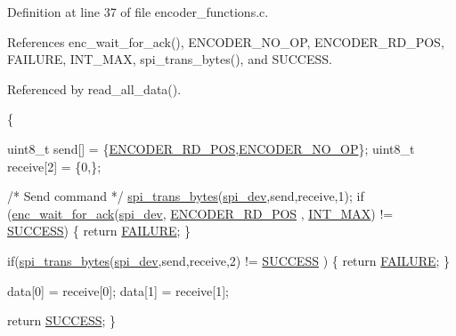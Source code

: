 Definition at line 37 of file encoder\-\_\-functions.\-c.



References enc\-\_\-wait\-\_\-for\-\_\-ack(), E\-N\-C\-O\-D\-E\-R\-\_\-\-N\-O\-\_\-\-O\-P, E\-N\-C\-O\-D\-E\-R\-\_\-\-R\-D\-\_\-\-P\-O\-S, F\-A\-I\-L\-U\-R\-E, I\-N\-T\-\_\-\-M\-A\-X, spi\-\_\-trans\-\_\-bytes(), and S\-U\-C\-C\-E\-S\-S.



Referenced by read\-\_\-all\-\_\-data().


\begin{DoxyCode}
                                                      \{

    uint8\_t send[] = \{\hyperlink{encoder__functions_8h_a24e6c0e05e904b10f56ae184da9e2aca}{ENCODER\_RD\_POS},\hyperlink{encoder__functions_8h_ac10b0f18ed2164776ad6843aa7908592}{ENCODER\_NO\_OP}\};
    uint8\_t receive[2] = \{0,\};
    
    \textcolor{comment}{/* Send command */}
    \hyperlink{communication_2spi__functions_8c_a3ae450d2b3ece27bb6036f811a7625a9}{spi\_trans\_bytes}(\hyperlink{CommunicationV0_2communication_8c_a4788f0a5355494bc6c13690e28f43783}{spi\_dev},send,receive,1);
    \textcolor{keywordflow}{if} (\hyperlink{group__enc_gad82fb44f2e735628ec95e003e4a1f93c}{enc\_wait\_for\_ack}(\hyperlink{CommunicationV0_2communication_8c_a4788f0a5355494bc6c13690e28f43783}{spi\_dev}, \hyperlink{encoder__functions_8h_a24e6c0e05e904b10f56ae184da9e2aca}{ENCODER\_RD\_POS}
      , \hyperlink{encoder__functions_8h_a9ec306f36d50c7375e74f0d1c55a3a67}{INT\_MAX}) != \hyperlink{calibration_2calibration_8h_aa90cac659d18e8ef6294c7ae337f6b58}{SUCCESS}) \{ 
        \textcolor{keywordflow}{return} \hyperlink{calibration_2calibration_8h_a6d58f9ac447476b4e084d7ca383f5183}{FAILURE}; 
    \}

    \textcolor{keywordflow}{if}(\hyperlink{communication_2spi__functions_8c_a3ae450d2b3ece27bb6036f811a7625a9}{spi\_trans\_bytes}(\hyperlink{CommunicationV0_2communication_8c_a4788f0a5355494bc6c13690e28f43783}{spi\_dev},send,receive,2) != \hyperlink{calibration_2calibration_8h_aa90cac659d18e8ef6294c7ae337f6b58}{SUCCESS}
      ) \{ 
        \textcolor{keywordflow}{return} \hyperlink{calibration_2calibration_8h_a6d58f9ac447476b4e084d7ca383f5183}{FAILURE}; 
    \}

   data[0] = receive[0];
   data[1] = receive[1];

   \textcolor{keywordflow}{return} \hyperlink{calibration_2calibration_8h_aa90cac659d18e8ef6294c7ae337f6b58}{SUCCESS};
\}
\end{DoxyCode}


